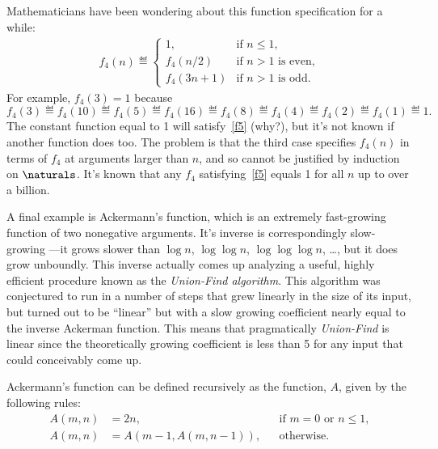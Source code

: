 Mathematicians have been wondering about this function specification for a
while:
\begin{eqnarray}\label{f5}
f_4(n) \eqdef\begin{cases}
 1, & \text{if $n\le 1$},\\
 f_4(n/2) &  \text{if $n>1$ is even},\\
 f_4(3n+1)& \text{if $n>1$ is odd}.
\end{cases}
\end{eqnarray}
For example, $f_4(3)=1$ because
\[
f_4(3)\eqdef f_4(10)\eqdef f_4(5)\eqdef f_4(16)\eqdef f_4(8)\eqdef
f_4(4)\eqdef f_4(2)\eqdef f_4(1)\eqdef 1.
\]
The constant function equal to 1 will satisfy~\eqref{f5} (why?), but it's not
known if another function does too.  The problem is that the third case
specifies $f_4(n)$ in terms of $f_4$ at arguments larger than $n$, and so
cannot be justified by induction on $\naturals$.  It's known that any
$f_4$ satisfying~\eqref{f5} equals 1 for all $n$ up to over a billion.

\iffalse
\textbf{Quick exercise:} Why does the constant function 1
satisfy~\eqref{f5}?
\fi

A final example is Ackermann's function, which is an extremely
fast-growing function of two nonegative arguments.  It's inverse is
correspondingly slow-growing ---it grows slower than $\log n$, $\log \log
n$, $\log \log \log n$, \dots, but it does grow unboundly.  This inverse
actually comes up analyzing a useful, highly efficient procedure known as
the \emph{Union-Find algorithm}.  This algorithm was conjectured to run in
a number of steps that grew linearly in the size of its input, but turned
out to be ``linear'' but with a slow growing coefficient nearly equal to
the inverse Ackerman function.  This means that pragmatically
\emph{Union-Find} is linear since the theoretically growing coefficient is
less than 5 for any input that could conceivably come up.

\iffalse
You will learn about Union-Find if you take the Algorithms course, 6.046.
We're mentioning this story to motivate an examination of the somewhat
unusual recursive definition of Ackermann's function, $A(m,n)$.
\fi

Ackermann's function can be defined recursively as the function, $A$,
given by the following rules:
\begin{align}
A(m,n) &=  2n, &&\text{if $m=0$ or $n \le 1$},\label{Am0}\\ 
A(m,n) &=  A(m-1,A(m,n-1)), &&\text{otherwise}.\label{AA}
\end{align}

